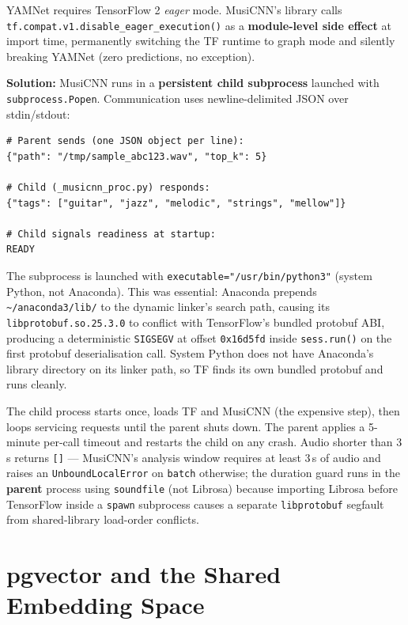 \documentclass[12pt,letterpaper]{report}
\begin{document}
YAMNet requires TensorFlow 2 \textit{eager} mode. MusiCNN's library calls \texttt{tf.compat.v1.disable\_eager\_execution()} as a \textbf{module-level side effect} at import time, permanently switching the TF runtime to graph mode and silently breaking YAMNet (zero predictions, no exception).

\textbf{Solution:} MusiCNN runs in a \textbf{persistent child subprocess} launched with \texttt{subprocess.Popen}. Communication uses newline-delimited JSON over stdin/stdout:

\begin{lstlisting}[style=pythonstyle,
  caption={MusiCNN subprocess IPC --- parent/child JSON protocol},
  label={lst:musicnn-ipc}]
# Parent sends (one JSON object per line):
{"path": "/tmp/sample_abc123.wav", "top_k": 5}

# Child (_musicnn_proc.py) responds:
{"tags": ["guitar", "jazz", "melodic", "strings", "mellow"]}

# Child signals readiness at startup:
READY
\end{lstlisting}

The subprocess is launched with \texttt{executable="/usr/bin/python3"} (system Python, not Anaconda). This was essential: Anaconda prepends \texttt{\textasciitilde/anaconda3/lib/} to the dynamic linker's search path, causing its \texttt{libprotobuf.so.25.3.0} to conflict with TensorFlow's bundled protobuf ABI, producing a deterministic \texttt{SIGSEGV} at offset \texttt{0x16d5fd} inside \texttt{sess.run()} on the first protobuf deserialisation call. System Python does not have Anaconda's library directory on its linker path, so TF finds its own bundled protobuf and runs cleanly.

The child process starts once, loads TF and MusiCNN (the expensive step), then loops servicing requests until the parent shuts down. The parent applies a 5-minute per-call timeout and restarts the child on any crash. Audio shorter than 3\,s returns \texttt{[]} --- MusiCNN's analysis window requires at least 3\,s of audio and raises an \texttt{UnboundLocalError} on \texttt{batch} otherwise; the duration guard runs in the \textbf{parent} process using \texttt{soundfile} (not Librosa) because importing Librosa before TensorFlow inside a \texttt{spawn} subprocess causes a separate \texttt{libprotobuf} segfault from shared-library load-order conflicts.

\section{pgvector and the Shared Embedding Space}
\end{document}
